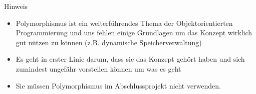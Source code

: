 \documentclass[presentation]{beamer}
\begin{document}
\begin{frame}[label={sec:org4b285dd}]{Hinweis}
\begin{itemize}
\item \alert{Polymorphismus} ist ein weiterführendes Thema der
Objektorientierten Programmierung und uns fehlen einige Grundlagen
um das Konzept wirklich gut nützen zu können (z.B. dynamische
Speicherverwaltung)
\item Es geht in erster Linie darum, \alert{dass sie das Konzept gehört haben}
und sich zumindest ungefähr vorstellen können um was es geht
\item Sie müssen Polymorphismus im Abschlussprojekt nicht verwenden.
\end{itemize}
\end{frame}
\end{document}
